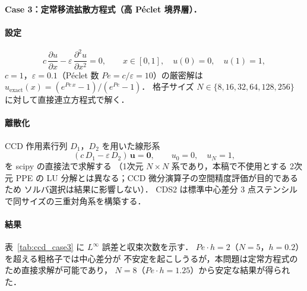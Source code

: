 \paragraph{Case 3：定常移流拡散方程式（高 Péclet 境界層）．}\label{app:ccd_case3}

\paragraph{設定}
\begin{equation}
  c\,\frac{\partial u}{\partial x} - \varepsilon\,\frac{\partial^2 u}{\partial x^2} = 0,
  \qquad x \in [0,1],\quad u(0)=0,\quad u(1)=1,
  \label{eq:ccd_advdiff}
\end{equation}
$c=1$，$\varepsilon = 0.1$（Péclet 数 $Pe = c/\varepsilon = 10$）の厳密解は
$u_{\mathrm{exact}}(x) = (e^{Pe\,x} - 1)/(e^{Pe} - 1)$．
格子サイズ $N \in \{8, 16, 32, 64, 128, 256\}$ に対して直接連立方程式で解く．

\paragraph{離散化}
CCD 作用素行列 $D_1$，$D_2$ を用いた線形系
\begin{equation}
  (c\,D_1 - \varepsilon\,D_2)\,\mathbf{u} = \mathbf{0},
  \qquad u_0 = 0,\quad u_N = 1,
  \label{eq:ccd_advdiff_sys}
\end{equation}
を scipy の直接法で求解する
（1次元 $N \times N$ 系であり，本稿で不使用とする
2次元 PPE の LU 分解とは異なる；CCD 微分演算子の空間精度評価が目的であるため
ソルバ選択は結果に影響しない）．
CDS2 は標準中心差分 3 点ステンシルで同サイズの三重対角系を構築する．

\paragraph{結果}
表~\ref{tab:ccd_case3} に $L^\infty$ 誤差と収束次数を示す．
$Pe \cdot h = 2$（$N=5$，$h=0.2$）を超える粗格子では中心差分が
不安定を起こしうるが，本問題は定常方程式のため直接求解が可能であり，
$N=8$（$Pe \cdot h = 1.25$）から安定な結果が得られた．


